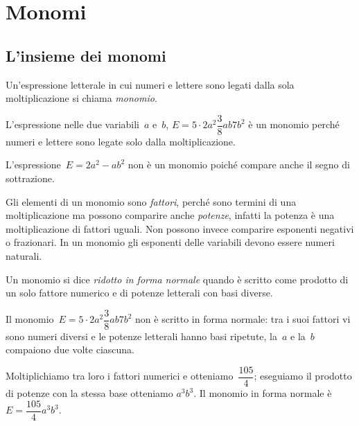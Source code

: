 \chapter{Monomi}
\section{L'insieme dei monomi}

\begin{definizione}
Un'espressione letterale in cui numeri e lettere sono legati dalla sola moltiplicazione si chiama \emph{monomio}.
\end{definizione}

\begin{exrig}
 \begin{esempio}
L'espressione nelle due variabili~$a$ e~$b$, $E=5\cdot 2a^{2}\dfrac{3}{8}ab7b^{2}$
è un monomio perché numeri e lettere sono legate solo dalla moltiplicazione.
 \end{esempio}

 \begin{esempio}
L'espressione~$E=2a^{2}-ab^{2}$ non è un monomio poiché compare anche il segno di sottrazione.
 \end{esempio}
\end{exrig}

\ovalbox{\risolvi \ref{ese:10.1}}

\osservazione
Gli elementi di un monomio sono \emph{fattori}, perché sono termini
di una moltiplicazione ma possono comparire anche \emph{potenze},
infatti la potenza è una moltiplicazione di fattori uguali. Non
possono invece comparire esponenti negativi o frazionari. In un monomio
gli esponenti delle variabili devono essere numeri naturali.

\begin{definizione}
Un monomio si dice \emph{ridotto in forma normale} quando è scritto come prodotto di un solo fattore
numerico e di potenze letterali con basi diverse.
\end{definizione}

\begin{exrig}
 \begin{esempio}
Il monomio~$E=5\cdot 2a^{2}\dfrac{3}{8}ab7b^{2}$ non è scritto in
forma normale: tra i suoi fattori vi sono numeri diversi e le potenze
letterali hanno basi ripetute, la~$a$ e la~$b$ compaiono due volte ciascuna.

Moltiplichiamo tra loro i fattori numerici e otteniamo~$\dfrac{105}{4}$; eseguiamo il prodotto di potenze con la stessa base otteniamo
$a^{3}b^{3}$. Il monomio in forma normale è~$E=\dfrac{105}{4}a^{3}b^{3}$.
 \end{esempio}
\end{exrig}

